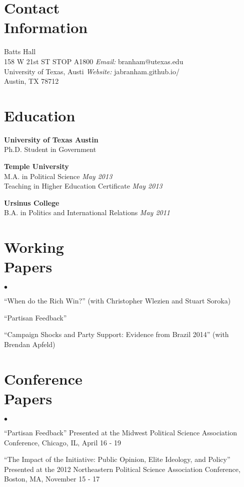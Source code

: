 \documentclass[margin,line]{res}
\newenvironment{list2}{
    \begin{list}{$\bullet$}{%
        \setlength{\itemsep}{0in}
        \setlength{\parsep}{0in} \setlength{\parskip}{0in}
        \setlength{\topsep}{0in} \setlength{\partopsep}{0in}
        \setlength{\leftmargin}{0.2in}}}{\end{list}}
\begin{document}

\begin{resume}


\section{\sc Contact \\Information}
Batts Hall               \hfill     \\
158 W 21st ST STOP A1800                     \hfill    {\em Email:}    branham@utexas.edu \\
University of Texas, Austi     \hfill    {\em Website:}   jabranham.github.io/ \\
Austin, TX 78712                  \hfill


\section{\sc Education}
{\bf University of Texas Austin}     \hfill     \\
 Ph.D. Student in Government       \hfill 

{\bf Temple University} \hfill  \\
M.A. in Political Science  \hfill     {\em  May 2013} \\
Teaching in Higher Education Certificate \hfill {\em May 2013}

{\bf Ursinus College}   \hfill     \\ 
B.A. in Politics and International Relations    \hfill      {\em May 2011} \\

\section{\sc Working\\Papers}
\begin{list2}
	\item ``When do the Rich Win?'' (with Christopher Wlezien and Stuart Soroka)
	\item ``Partisan Feedback''
	\item ``Campaign Shocks and Party Support: Evidence from Brazil 2014'' (with Brendan Apfeld)
\end{list2}

\section{\sc Conference\\Papers}
\begin{list2}
	\item ``Partisan Feedback'' Presented at the Midwest Political Science Association Conference, Chicago, IL, April 16 - 19
	\item ``The Impact of the Initiative: Public Opinion, Elite Ideology, and Policy'' Presented at the 2012 Northeastern Political Science Association Conference, Boston, MA, November 15 - 17
\end{list2}


\end{resume}
\end{document}
